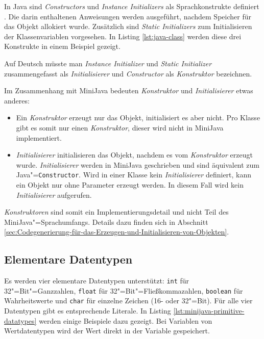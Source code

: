 In Java sind \emph{Constructors} und \emph{Instance Initializers} als Sprachkonstrukte definiert \cite{Java8Specification}. Die darin enthaltenen Anweisungen werden ausgeführt, nachdem Speicher für das Objekt allokiert wurde. Zusätzlich sind \emph{Static Initializers} zum Initialisieren der Klassenvariablen vorgesehen. In Listing \ref{lst:java-class} werden diese drei Konstrukte in einem Beispiel gezeigt.



Auf Deutsch müsste man \emph{Instance Initializer} und \emph{Static Initializer} zusammengefasst als \emph{Initialisierer} und \emph{Constructor} als \emph{Konstruktor} bezeichnen.

Im Zusammenhang mit MiniJava bedeuten \emph{Konstruktor} und \emph{Initialisierer} etwas anderes:
\begin{itemize}
    \item Ein \emph{Konstruktor} erzeugt nur das Objekt, initialisiert es aber nicht. Pro Klasse gibt es somit nur einen \emph{Konstruktor}, dieser wird nicht in MiniJava implementiert. 
    \item \emph{Initialisierer} initialisieren das Objekt, nachdem es vom \emph{Konstruktor} erzeugt wurde. \emph{Initialisierer} werden in MiniJava geschrieben und sind äquivalent zum Java"=\lstinline{Constructor}. Wird in einer Klasse kein \emph{Initialisierer} definiert, kann ein Objekt nur ohne Parameter erzeugt werden. In diesem Fall wird kein \emph{Initialisierer} aufgerufen.
\end{itemize}

\emph{Konstruktoren} sind somit ein Implementierungsdetail und nicht Teil des MiniJava"=Sprachumfangs. Details dazu finden sich in Abschnitt \ref{sec:Codegenerierung-für-das-Erzeugen-und-Initialisieren-von-Objekten}.

\subsection{Elementare Datentypen}

Es werden vier elementare Datentypen unterstützt: \lstinline{int} für 32"=Bit"=Ganzzahlen, \lstinline{float} für 32"=Bit"=Fließkommazahlen, \lstinline{boolean} für Wahrheitswerte und \lstinline{char} für einzelne Zeichen (16- oder 32"=Bit). Für alle vier Datentypen gibt es entsprechende Literale. In Listing \ref{lst:minijava-primitive-datatypes} werden einige Beispiele dazu gezeigt. Bei Variablen von Wertdatentypen wird der Wert direkt in der Variable gespeichert.

